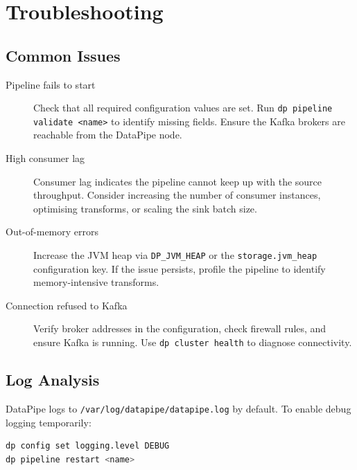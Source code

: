\documentclass[
    language=english,
    doctype=manual,
    institution=none,
    titlestyle=book,
    oneside,
]{../../omnilatex}
\begin{document}
\chapter{Troubleshooting}
\label{sec:troubleshooting}

\section{Common Issues}

\begin{description}
    \item[Pipeline fails to start]
        Check that all required configuration values are set. Run
        \texttt{dp pipeline validate <name>} to identify missing fields.
        Ensure the Kafka brokers are reachable from the DataPipe node.

    \item[High consumer lag]
        Consumer lag indicates the pipeline cannot keep up with the source
        throughput. Consider increasing the number of consumer instances,
        optimising transforms, or scaling the sink batch size.

    \item[Out-of-memory errors]
        Increase the JVM heap via \texttt{DP\_JVM\_HEAP} or the
        \texttt{storage.jvm\_heap} configuration key. If the issue
        persists, profile the pipeline to identify memory-intensive
        transforms.

    \item[Connection refused to Kafka]
        Verify broker addresses in the configuration, check firewall
        rules, and ensure Kafka is running. Use
        \texttt{dp cluster health} to diagnose connectivity.
\end{description}

\section{Log Analysis}

DataPipe logs to \texttt{/var/log/datapipe/datapipe.log} by default. To
enable debug logging temporarily:

\begin{lstlisting}[language=bash]
dp config set logging.level DEBUG
dp pipeline restart <name>
\end{lstlisting}
\end{document}
